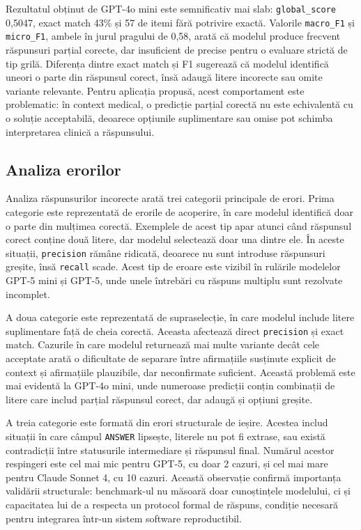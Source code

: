 \documentclass[12pt, a4paper, oneside, romanian]{teza-upb}
\begin{document}
Rezultatul obținut de GPT-4o mini este semnificativ mai slab: \texttt{global\_score} 0,5047, exact match 43\% și 57 de itemi fără potrivire exactă. Valorile \texttt{macro\_F1} și \texttt{micro\_F1}, ambele în jurul pragului de 0,58, arată că modelul produce frecvent răspunsuri parțial corecte, dar insuficient de precise pentru o evaluare strictă de tip grilă. Diferența dintre exact match și F1 sugerează că modelul identifică uneori o parte din răspunsul corect, însă adaugă litere incorecte sau omite variante relevante. Pentru aplicația propusă, acest comportament este problematic: în context medical, o predicție parțial corectă nu este echivalentă cu o soluție acceptabilă, deoarece opțiunile suplimentare sau omise pot schimba interpretarea clinică a răspunsului.

\subsection{Analiza erorilor}

Analiza răspunsurilor incorecte arată trei categorii principale de erori. Prima categorie este reprezentată de erorile de acoperire, în care modelul identifică doar o parte din mulțimea corectă. Exemplele de acest tip apar atunci când răspunsul corect conține două litere, dar modelul selectează doar una dintre ele. În aceste situații, \texttt{precision} rămâne ridicată, deoarece nu sunt introduse răspunsuri greșite, însă \texttt{recall} scade. Acest tip de eroare este vizibil în rulările modelelor GPT-5 mini și GPT-5, unde unele întrebări cu răspuns multiplu sunt rezolvate incomplet.

A doua categorie este reprezentată de supraselecție, în care modelul include litere suplimentare față de cheia corectă. Aceasta afectează direct \texttt{precision} și exact match. Cazurile în care modelul returnează mai multe variante decât cele acceptate arată o dificultate de separare între afirmațiile susținute explicit de context și afirmațiile plauzibile, dar neconfirmate suficient. Această problemă este mai evidentă la GPT-4o mini, unde numeroase predicții conțin combinații de litere care includ parțial răspunsul corect, dar adaugă și opțiuni greșite.

A treia categorie este formată din erori structurale de ieșire. Acestea includ situații în care câmpul \texttt{ANSWER} lipsește, literele nu pot fi extrase, sau există contradicții între statusurile intermediare și răspunsul final. Numărul acestor respingeri este cel mai mic pentru GPT-5, cu doar 2 cazuri, și cel mai mare pentru Claude Sonnet 4, cu 10 cazuri. Această observație confirmă importanța validării structurale: benchmark-ul nu măsoară doar cunoștințele modelului, ci și capacitatea lui de a respecta un protocol formal de răspuns, condiție necesară pentru integrarea într-un sistem software reproductibil.
\end{document}
